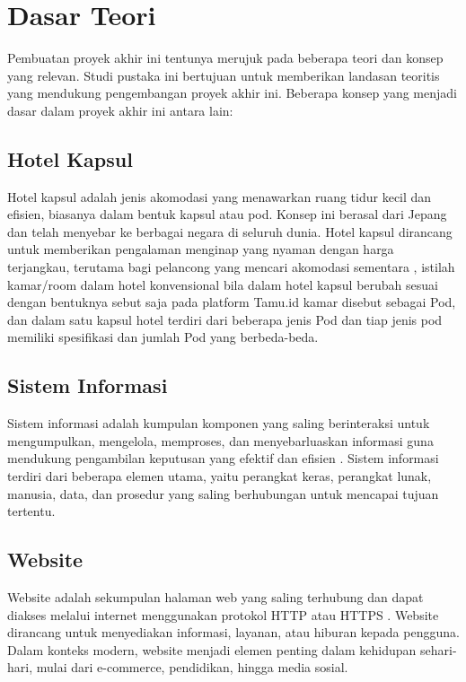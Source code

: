 \section{Dasar Teori}

Pembuatan proyek akhir ini tentunya merujuk pada beberapa teori dan konsep yang relevan. Studi pustaka ini bertujuan untuk memberikan landasan teoritis yang mendukung pengembangan proyek akhir ini. Beberapa konsep yang menjadi dasar dalam proyek akhir ini antara lain:

\subsection{Hotel Kapsul}

Hotel kapsul adalah jenis akomodasi yang menawarkan ruang tidur kecil dan efisien, biasanya dalam bentuk kapsul atau pod. Konsep ini berasal dari Jepang dan telah menyebar ke berbagai negara di seluruh dunia. Hotel kapsul dirancang untuk memberikan pengalaman menginap yang nyaman dengan harga terjangkau, terutama bagi pelancong yang mencari akomodasi sementara \cite{bobobox}, istilah kamar/room dalam hotel konvensional bila dalam hotel kapsul berubah sesuai dengan bentuknya sebut saja pada platform Tamu.id kamar disebut sebagai Pod, dan dalam satu kapsul hotel terdiri dari beberapa jenis Pod dan tiap jenis pod memiliki spesifikasi dan jumlah Pod yang berbeda-beda.


\subsection{Sistem Informasi}
Sistem informasi adalah kumpulan komponen yang saling berinteraksi untuk mengumpulkan, mengelola, memproses, dan menyebarluaskan informasi guna mendukung pengambilan keputusan yang efektif dan efisien \cite{stair2015}. Sistem informasi terdiri dari beberapa elemen utama, yaitu perangkat keras, perangkat lunak, manusia, data, dan prosedur yang saling berhubungan untuk mencapai tujuan tertentu.

\subsection{Website}
Website adalah sekumpulan halaman web yang saling terhubung dan dapat diakses melalui internet menggunakan protokol HTTP atau HTTPS \cite{mann2016}. Website dirancang untuk menyediakan informasi, layanan, atau hiburan kepada pengguna. Dalam konteks modern, website menjadi elemen penting dalam kehidupan sehari-hari, mulai dari e-commerce, pendidikan, hingga media sosial.

